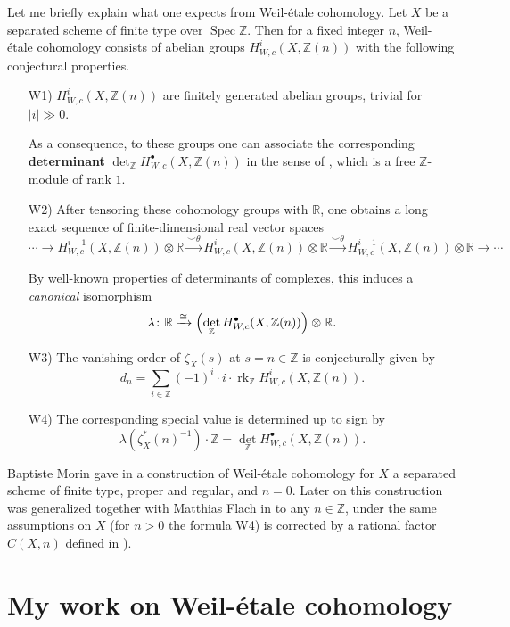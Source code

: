 \documentclass{article}
\DeclareMathOperator{\Spec}{Spec}
\DeclareMathOperator{\rk}{rk}
\newcommand{\ZZ}{\mathbb{Z}}
\newcommand{\RR}{\mathbb{R}}
\begin{document}
Let me briefly explain what one expects from Weil-étale cohomology. Let $X$ be a
separated scheme of finite type over $\Spec \ZZ$. Then for a fixed integer $n$,
Weil-étale cohomology consists of abelian groups $H^i_{W,c} (X,\ZZ(n))$ with the
following conjectural properties.

\begin{enumerate}
\item[W1)] $H^i_{W,c} (X,\ZZ(n))$ are finitely generated abelian groups, trivial
  for $|i| \gg 0$.

  As a consequence, to these groups one can associate the corresponding
  \textbf{determinant} $\det_\ZZ H^\bullet_{W,c} (X, \ZZ(n))$ in the sense of
  \cite{Knudsen-Mumford-1976}, which is a free $\ZZ$-module of rank $1$.

\item[W2)] After tensoring these cohomology groups with $\RR$, one obtains a long
  exact sequence of finite-dimensional real vector spaces
  $$\cdots \to H^{i-1}_{W,c} (X,\ZZ(n)) \otimes \RR \xrightarrow{\smile\theta} H^i_{W,c} (X,\ZZ(n)) \otimes \RR \xrightarrow{\smile\theta} H^{i+1}_{W,c} (X,\ZZ(n)) \otimes \RR \to \cdots$$

  By well-known properties of determinants of complexes, this induces a
  \emph{canonical} isomorphism
  $$\lambda\colon \RR \xrightarrow{\cong} \Bigl(\det_\ZZ H^\bullet_{W,c} (X, \ZZ(n))\Bigr) \otimes \RR.$$

\item[W3)] The vanishing order of $\zeta_X (s)$ at $s = n \in \ZZ$ is
  conjecturally given by
  $$d_n = \sum_{i\in \ZZ} (-1)^i \cdot i \cdot \rk_\ZZ H^i_{W,c} (X,\ZZ(n)).$$

\item[W4)] The corresponding special value is determined up to sign by
  $$\lambda (\zeta_X^* (n)^{-1})\cdot \ZZ = \det_\ZZ H^\bullet_{W,c} (X, \ZZ (n)).$$
\end{enumerate}

Baptiste Morin gave in \cite{Morin-2014} a construction of Weil-étale cohomology
for $X$ a separated scheme of finite type, proper and regular, and $n =
0$. Later on this construction was generalized together with Matthias Flach in
\cite{Flach-Morin-2018} to any $n \in \ZZ$, under the same assumptions on $X$
(for $n > 0$ the formula W4) is corrected by a rational factor $C(X,n)$ defined
in \cite[\S 5.4]{Flach-Morin-2018}).

\section{My work on Weil-étale cohomology}
\end{document}
